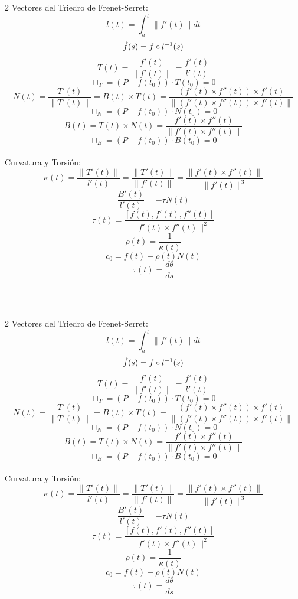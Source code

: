 \documentclass{article}
\begin{document}
\begin{multicols}{2}
Vectores del Triedro de Frenet-Serret:
   $$ l(t) = \int_a^t \| f'(t) \| dt$$
   $$ \Hat{f}(s) = f \circ l^{-1}(s) $$
   $$T(t) = \frac{f'(t)}{\|f'(t)\|} = \frac{f'(t)}{l'(t)}$$
   $$ \sqcap_T = (P - f(t_0)) \cdot T(t_0) = 0 $$
   $$N(t) = \frac{T'(t)}{\|T'(t)\|} = B(t) \times T(t) = \frac{(f'(t) \times f''(t)) \times f'(t)}{\| (f'(t) \times f''(t)) \times f'(t) \|}$$
   $$ \sqcap_N = (P - f(t_0)) \cdot N(t_0) = 0 $$
   $$B(t) = T(t) \times N(t) = \frac{f'(t) \times f''(t)}{\| f'(t) \times f''(t) \|}$$
   $$ \sqcap_B = (P - f(t_0)) \cdot B(t_0) = 0 $$
   \\
Curvatura y Torsión:
   $$\kappa(t) = \frac{\|T'(t)\|}{l'(t)} = \frac{\|T'(t)\|}{\|f'(t)\|} = \frac{\| f'(t) \times f''(t) \|}{\| f'(t) \|^3}$$
   $$ \frac{B'(t)}{l'(t)} = -\tau N(t) $$
   $$\tau(t) = \frac{[f(t),f'(t),f''(t)]}{\| f'(t) \times f''(t) \|^2}$$
   $$\rho(t) = \frac{1}{\kappa(t)}$$
   $$ c_0 = f(t) + \rho(t) N (t)$$
   $$\tau(t) = \frac{d\theta}{ds}$$
\end{multicols} 
\textit{}\\\\
\textit{}
\begin{multicols}{2}
Vectores del Triedro de Frenet-Serret:
   $$ l(t) = \int_a^t \| f'(t) \| dt$$
   $$ \Hat{f}(s) = f \circ l^{-1}(s) $$
   $$T(t) = \frac{f'(t)}{\|f'(t)\|} = \frac{f'(t)}{l'(t)}$$
   $$ \sqcap_T = (P - f(t_0)) \cdot T(t_0) = 0 $$
   $$N(t) = \frac{T'(t)}{\|T'(t)\|} = B(t) \times T(t) = \frac{(f'(t) \times f''(t)) \times f'(t)}{\| (f'(t) \times f''(t)) \times f'(t) \|}$$
   $$ \sqcap_N = (P - f(t_0)) \cdot N(t_0) = 0 $$
   $$B(t) = T(t) \times N(t) = \frac{f'(t) \times f''(t)}{\| f'(t) \times f''(t) \|}$$
   $$ \sqcap_B = (P - f(t_0)) \cdot B(t_0) = 0 $$
   \\
Curvatura y Torsión:
   $$\kappa(t) = \frac{\|T'(t)\|}{l'(t)} = \frac{\|T'(t)\|}{\|f'(t)\|} = \frac{\| f'(t) \times f''(t) \|}{\| f'(t) \|^3}$$
   $$ \frac{B'(t)}{l'(t)} = -\tau N(t) $$
   $$\tau(t) = \frac{[f(t),f'(t),f''(t)]}{\| f'(t) \times f''(t) \|^2}$$
   $$\rho(t) = \frac{1}{\kappa(t)}$$
   $$ c_0 = f(t) + \rho(t) N (t)$$
   $$\tau(t) = \frac{d\theta}{ds}$$
\end{multicols}
\textit{}\\\\
\textit{}
\end{document}
